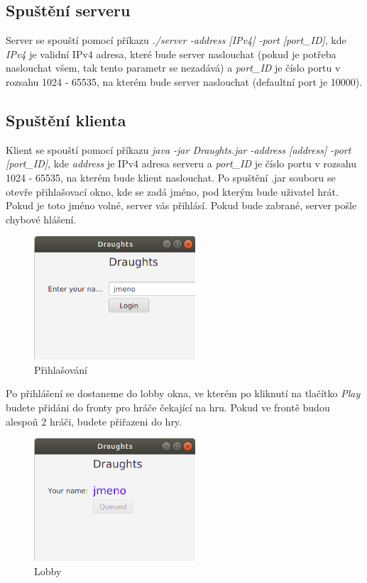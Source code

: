 \documentclass[12pt, a4paper]{article}
\begin{document}
\subsection{Spuštění serveru}
\label{Spuštění_serveru}
Server se spouští pomocí příkazu \textit{./server -address [IPv4] -port [port\_ID]}, kde \textit{IPv4} je validní IPv4 adresa, které bude server naslouchat (pokud je potřeba naslouchat všem, tak tento parametr se nezadává) a \textit{port\_ID} je číslo portu v rozsahu 1024 - 65535, na kterém bude server naslouchat (defaultní port je 10000). 
\subsection{Spuštění klienta}
\label{Spuštění_klienta}
Klient se spouští pomocí příkazu \textit{java -jar Draughts.jar -address [address] -port [port\_ID]}, kde \textit{address} je IPv4 adresa serveru a \textit{port\_ID} je číslo portu v rozsahu 1024 - 65535, na kterém bude klient naslouchat.
\newline
Po spuštění .jar souboru se otevře přihlašovací okno, kde se zadá jméno, pod kterým bude uživatel hrát. Pokud je toto jméno volné, server vás přihlásí. Pokud bude zabrané, server pošle chybové hlášení.
\begin {figure}[h]
\centering
\includegraphics[width=6cm]{img/login}
\caption{Přihlašování}
\label{fig:login}
\end {figure}
\newpage
Po přihlášení se dostaneme do lobby okna, ve kterém po kliknutí na tlačítko \textit{Play} budete přidáni do fronty pro hráče čekající na hru. Pokud ve frontě budou alespoň 2 hráči, budete přiřazeni do hry.
\begin {figure}[h]
\centering
\includegraphics[width=6cm]{img/lobby}
\caption{Lobby}
\label{fig:lobby}
\end {figure}
\end{document}
